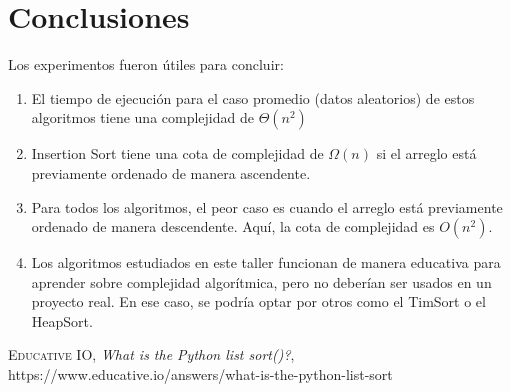 \documentclass[letter]{article}
\begin{document}
\section{Conclusiones}
Los experimentos fueron útiles para concluir:
\begin{enumerate}
    \item El tiempo de ejecución para el caso promedio (datos aleatorios) de estos algoritmos tiene una complejidad de $\Theta(n^2)$
    \item Insertion Sort tiene una cota de complejidad de $\Omega(n)$ si el arreglo está previamente ordenado de manera ascendente.
    \item Para todos los algoritmos, el peor caso es cuando el arreglo está previamente ordenado de manera descendente. Aquí, la cota de complejidad es $O(n^2)$.
    \item Los algoritmos estudiados en este taller funcionan de manera educativa para aprender sobre complejidad algorítmica, pero no deberían ser usados en un proyecto real. En ese caso, se podría optar por otros como el TimSort o el HeapSort.
\end{enumerate}

\begin{thebibliography}{X}
 \textsc{Educative IO},
\textit{What is the Python list sort()?}, https://www.educative.io/answers/what-is-the-python-list-sort

\end{thebibliography}
\end{document}
